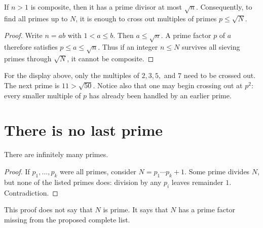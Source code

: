 \begin{proposition}
If $n>1$ is composite, then it has a prime divisor at most $\sqrt n$.
Consequently, to find all primes up to $N$, it is enough to cross out multiples
of primes $p\le\sqrt N$.
\end{proposition}

\begin{proof}
Write $n=ab$ with $1<a\le b$. Then $a\le\sqrt n$. A prime factor $p$ of $a$
therefore satisfies $p\le a\le\sqrt n$. Thus if an integer $n\le N$ survives
all sieving primes through $\sqrt N$, it cannot be composite.
\end{proof}

\begin{checkpoint}
For the display above, only the multiples of $2,3,5,$ and $7$ need to be
crossed out. The next prime is $11>\sqrt{50}$. Notice also that one may begin
crossing out at $p^2$: every smaller multiple of $p$ has already been handled
by an earlier prime.
\end{checkpoint}

\section{There is no last prime}

\begin{theorem}[Euclid]
There are infinitely many primes.
\end{theorem}

\begin{proof}
If $p_1,\dots,p_k$ were all primes, consider $N=p_1\cdots p_k+1$. Some prime divides $N$, but none of the listed primes does: division by any $p_i$ leaves remainder $1$. Contradiction.
\end{proof}

This proof does not say that $N$ is prime. It says that $N$ has a prime factor missing from the proposed complete list.

